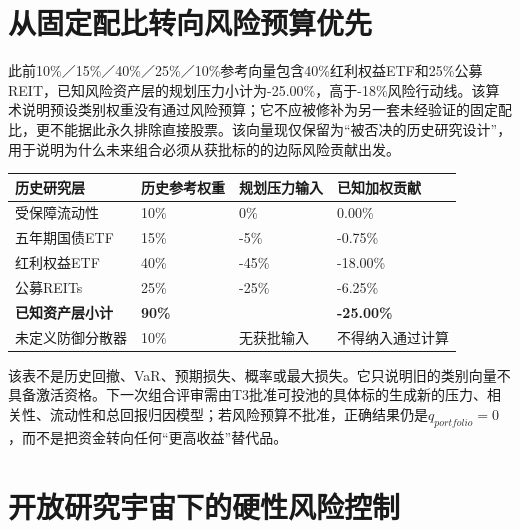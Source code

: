 \section{从固定配比转向风险预算优先}

此前10\%／15\%／40\%／25\%／10\%参考向量包含40\%红利权益ETF和25\%公募REIT，已知风险资产层的规划压力小计为-25.00\%，高于-18\%风险行动线。该算术说明预设类别权重没有通过风险预算；它不应被修补为另一套未经验证的固定配比，更不能据此永久排除直接股票。该向量现仅保留为“被否决的历史研究设计”，用于说明为什么未来组合必须从获批标的的边际风险贡献出发。

\begin{exhibitbox}
\small
\begin{tabularx}{\exhibitboxwidth}{L{3.1cm}P P P}
\toprule
\textbf{历史研究层} & \textbf{历史参考权重} & \textbf{规划压力输入} & \textbf{已知加权贡献} \\
\midrule
受保障流动性 & 10\% & 0\% & 0.00\% \\
五年期国债ETF & 15\% & -5\% & -0.75\% \\
红利权益ETF & 40\% & -45\% & -18.00\% \\
公募REITs & 25\% & -25\% & -6.25\% \\
\midrule
\textbf{已知资产层小计} & \textbf{90\%} &  & \textbf{-25.00\%} \\
未定义防御分散器 & 10\% & 无获批输入 & 不得纳入通过计算 \\
\bottomrule
\end{tabularx}
\end{exhibitbox}

该表不是历史回撤、VaR、预期损失、概率或最大损失。它只说明旧的类别向量不具备激活资格。下一次组合评审需由T3批准可投池的具体标的生成新的压力、相关性、流动性和总回报归因模型；若风险预算不批准，正确结果仍是$q_{portfolio}=0$，而不是把资金转向任何“更高收益”替代品。

\section{开放研究宇宙下的硬性风险控制}

